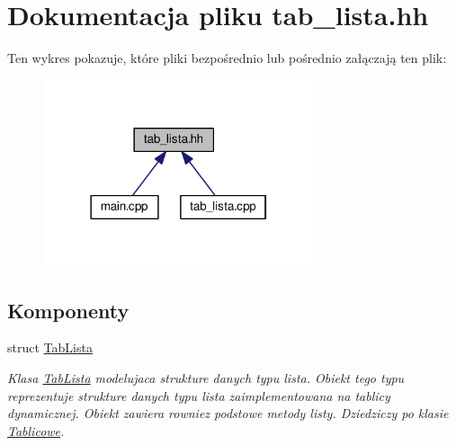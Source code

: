 \hypertarget{tab__lista_8hh}{\section{Dokumentacja pliku tab\-\_\-lista.\-hh}
\label{tab__lista_8hh}
}
Ten wykres pokazuje, które pliki bezpośrednio lub pośrednio załączają ten plik\-:
\nopagebreak
\begin{figure}[H]
\begin{center}
\leavevmode
\includegraphics[width=225pt]{tab__lista_8hh__dep__incl}
\end{center}
\end{figure}
\subsection*{Komponenty}
\begin{DoxyCompactItemize}
\item 
struct \hyperlink{struct_tab_lista}{Tab\-Lista}
\begin{DoxyCompactList}\small\item\em Klasa \hyperlink{struct_tab_lista}{Tab\-Lista} modelujaca strukture danych typu lista. Obiekt tego typu reprezentuje strukture danych typu lista zaimplementowana na tablicy dynamicznej. Obiekt zawiera rowniez podstowe metody listy. Dziedziczy po klasie \hyperlink{class_tablicowe}{Tablicowe}. \end{DoxyCompactList}\end{DoxyCompactItemize}
